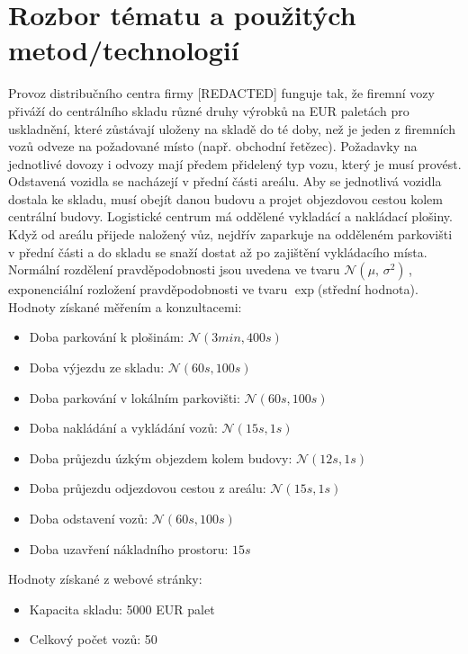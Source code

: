\documentclass[a4paper, 11pt]{article}
\begin{document}
\section{Rozbor tématu a použitých metod/technologií}
Provoz distribučního centra firmy [REDACTED] funguje tak, že firemní vozy přiváží do centrálního skladu různé druhy výrobků na EUR paletách\cite{PAL} pro uskladnění, které zůstávají uloženy na skladě do té doby, než je jeden z firemních vozů odveze na požadované místo (např. obchodní řetězec).
Požadavky na jednotlivé dovozy i odvozy mají předem přidelený typ vozu, který je musí provést. Odstavená vozidla se nacházejí v přední části areálu. Aby se jednotlivá vozidla dostala ke skladu, musí obejít danou budovu a projet objezdovou cestou kolem centrální budovy. Logistické centrum má oddělené vykladácí a nakládací plošiny. Když od areálu přijede naložený vůz, nejdřív zaparkuje na odděleném parkovišti v přední části a do skladu se snaží dostat až po zajištění vykládacího místa.\\

\noindent Normální rozdělení pravděpodobnosti jsou uvedena ve tvaru $\mathcal{N}(\mu,\,\sigma^{2})\,$, exponenciální rozložení pravděpodobnosti ve tvaru $\exp$(střední hodnota).\\


\noindent Hodnoty získané měřením a konzultacemi:
\begin{itemize}
\item Doba parkování k plošinám: $\mathcal{N}(3 min, 400s)$
\item Doba výjezdu ze skladu: $\mathcal{N}(60s, 100s)$
\item Doba parkování v lokálním parkovišti: $\mathcal{N}(60s, 100s)$
\item Doba nakládání a vykládání vozů: $\mathcal{N}(15s, 1s)$
\item Doba průjezdu úzkým objezdem kolem budovy: $\mathcal{N}(12s, 1s)$
\item Doba průjezdu odjezdovou cestou z areálu: $\mathcal{N}(15s, 1s)$
\item Doba odstavení vozů: $\mathcal{N}(60s, 100s)$
\item Doba uzavření	nákladního prostoru: $15s$
\end{itemize}

\newpage
\noindent Hodnoty získané z webové stránky\cite{LAL}:
\begin{itemize}
\item Kapacita skladu: 5000 EUR palet
\item Celkový počet vozů: 50
\end{itemize}
\end{document}
